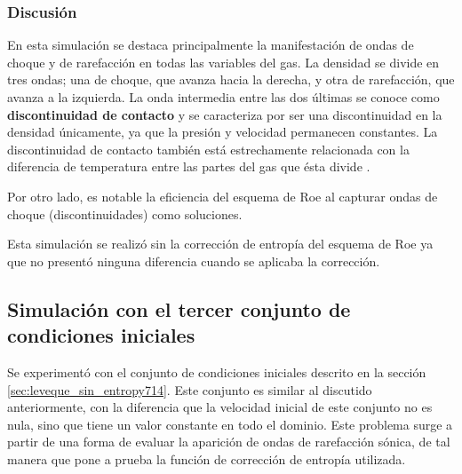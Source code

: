 \subsubsection{Discusión}
En esta simulación se destaca principalmente la manifestación de ondas de choque y de rarefacción en todas las variables del gas. La densidad se divide en tres ondas; una de choque, que avanza hacia la derecha, y otra de rarefacción, que avanza a la izquierda. La onda intermedia entre las dos últimas se conoce como \textbf{discontinuidad de contacto} \cite{thesis-euler-godunov} y se caracteriza por ser una discontinuidad en la densidad únicamente, ya que la presión y velocidad permanecen constantes. La discontinuidad de contacto también está estrechamente relacionada con la diferencia de temperatura entre las partes del gas que ésta divide \cite{LeVeque}. 

Por otro lado, es notable la eficiencia del esquema de Roe al capturar ondas de choque (discontinuidades) como soluciones.

Esta simulación se realizó sin la corrección de entropía del esquema de Roe ya que no presentó ninguna diferencia cuando se aplicaba la corrección.

\subsection{Simulación con el tercer conjunto de condiciones iniciales}
\label{sec:set-3-cpp}
Se experimentó con el conjunto de condiciones iniciales descrito en la sección \ref{sec:leveque_sin_entropy714}. Este conjunto es similar al discutido anteriormente, con la diferencia que la velocidad inicial de este conjunto no es nula, sino que tiene un valor constante en todo el dominio. Este problema surge a partir de una forma de evaluar la aparición de ondas de rarefacción sónica, de tal manera que pone a prueba la función de corrección de entropía utilizada.

